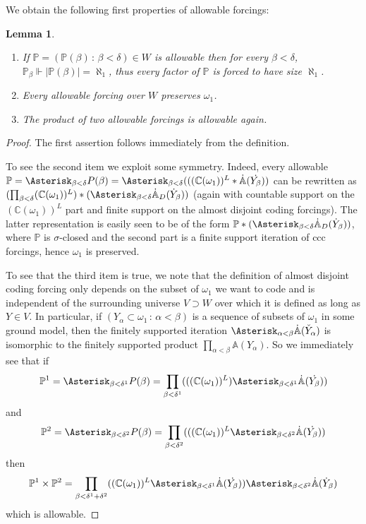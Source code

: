 \documentclass[a4paper,11pt]{article}
\newtheorem{lemma}[theorem]{Lemma}
\newcommand{\forceP}{\mathbb{P}}
\begin{document}
 We obtain the following first properties of allowable forcings:
 \begin{lemma} 


\begin{enumerate}
\item If $\forceP=(\forceP(\beta) \, : \, \beta < \delta) \in W$ is allowable then for every $\beta < \delta$, $\forceP_{\beta} \Vdash| \forceP(\beta)|= \aleph_1$, thus every factor of $\forceP$ is forced to have size $\aleph_1$.
\item Every allowable forcing over $W$ preserves $\omega_1$.
\item The product of two allowable forcings is allowable again.
\end{enumerate}
\end{lemma}
\begin{proof}
The first assertion follows immediately from the definition.

To see the second item we exploit some symmetry.
Indeed, every allowable $\forceP = \Asterisk_{\beta < \delta} P(\beta)= \Asterisk_{\beta < \delta} ( ((\mathbb{C} (\omega_1))^L \ast \dot{\mathbb{A}} (\dot{Y_{\beta} }) )$ can be rewritten as $(\prod_{\beta < \delta}  (\mathbb{C} (\omega_1))^L  )\ast (\Asterisk_{\beta < \delta}  \dot{\mathbb{A}}_D (\dot{Y}_{\beta} ))$ (again with countable support on the  $(\mathbb{C} (\omega_1))^L$ part and finite support on the almost disjoint coding forcings). The latter representation is easily seen to be of the form $\forceP \ast (\Asterisk_{\beta < \delta}  \dot{\mathbb{A}}_D(\dot{Y}_{\beta} ))$, where $\forceP$ is $\sigma$-closed and the second part is a finite support iteration of ccc forcings, hence $\omega_1$ is preserved.

To see that the third item is true, we note that the definition of almost disjoint coding forcing only depends on the subset of $\omega_1$ we want to code and is independent of the surrounding universe $V \supset W$ over which it is defined as long as $Y \in  V$. In particular, if $(Y_{\alpha} \subset \omega_1 \,: \, \alpha < \beta)$ is a sequence of subsets of $\omega_1$ in some ground model, then the finitely supported iteration $\Asterisk_{\alpha< \beta} \dot{\mathbb{A}} (\check{Y}_{\alpha} )$ is isomorphic to the finitely supported product $\prod_{\alpha < \beta} \mathbb{A} (Y_{\alpha} )$.
So we immediately see that if
\[ \forceP^1 = \Asterisk_{\beta < \delta^1} P(\beta)= \prod_{\beta < \delta^1} ( ((\mathbb{C} (\omega_1))^L)  \Asterisk_{\beta < \delta^1} \dot{\mathbb{A}} (\dot{Y_{\beta} }) ) \]
and
\[ \forceP^2 = \Asterisk_{\beta < \delta^2} P(\beta)= \prod_{\beta < \delta^2} ( ((\mathbb{C} (\omega_1))^L \Asterisk_{\beta < \delta^2} \dot{\mathbb{A}} (\dot{Y_{\beta} }) )\]
then
\[ \forceP^1 \times \forceP^2 = \prod_{\beta < \delta^1 + \delta^2} ((\mathbb{C} (\omega_1))^L \Asterisk_{\beta <\delta^1} \dot{\mathbb{A}} (\dot{Y_{\beta} }) )  \Asterisk_{\beta < \delta^2} \dot{\mathbb{A}} (\dot{Y}_{\beta}) \]
which is allowable.
\end{proof}
\end{document}
